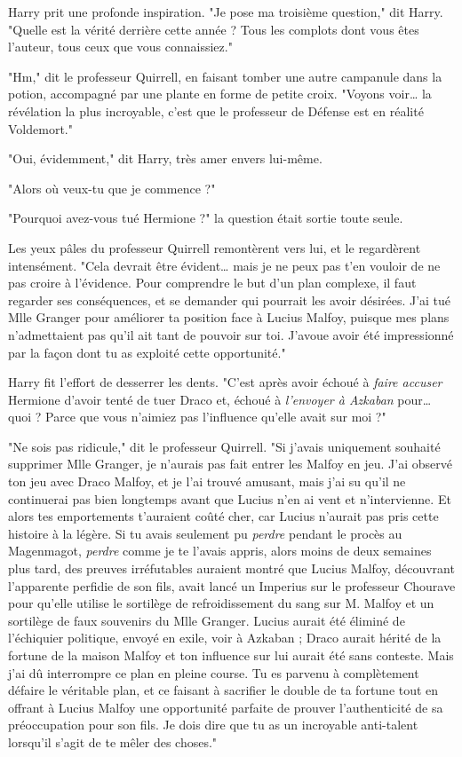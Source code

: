 Harry prit une profonde inspiration. "Je pose ma troisième question," dit Harry. "Quelle est la vérité derrière cette année ? Tous les complots dont vous êtes l'auteur, tous ceux que vous connaissiez."

"Hm," dit le professeur Quirrell, en faisant tomber une autre campanule dans la potion, accompagné par une plante en forme de petite croix. "Voyons voir… la révélation la plus incroyable, c'est que le professeur de Défense est en réalité Voldemort."

"Oui, évidemment," dit Harry, très amer envers lui-même.

"Alors où veux-tu que je commence ?"

"Pourquoi avez-vous tué Hermione ?" la question était sortie toute seule.

Les yeux pâles du professeur Quirrell remontèrent vers lui, et le regardèrent intensément. "Cela devrait être évident… mais je ne peux pas t'en vouloir de ne pas croire à l'évidence. Pour comprendre le but d'un plan complexe, il faut regarder ses conséquences, et se demander qui pourrait les avoir désirées. J'ai tué Mlle Granger pour améliorer ta position face à Lucius Malfoy, puisque mes plans n'admettaient pas qu'il ait tant de pouvoir sur toi. J'avoue avoir été impressionné par la façon dont tu as exploité cette opportunité."

Harry fit l'effort de desserrer les dents. "C'est après avoir échoué à \emph{faire accuser}  Hermione d'avoir tenté de tuer Draco et, échoué à \emph{l'envoyer à Azkaban}  pour… quoi ? Parce que vous n'aimiez pas l'influence qu'elle avait sur moi ?"

"Ne sois pas ridicule," dit le professeur Quirrell. "Si j'avais uniquement souhaité supprimer Mlle Granger, je n'aurais pas fait entrer les Malfoy en jeu. J'ai observé ton jeu avec Draco Malfoy, et je l'ai trouvé amusant, mais j'ai su qu'il ne continuerai pas bien longtemps avant que Lucius n'en ai vent et n'intervienne. Et alors tes emportements t'auraient coûté cher, car Lucius n'aurait pas pris cette histoire à la légère. Si tu avais seulement pu \emph{perdre}  pendant le procès au Magenmagot, \emph{perdre}  comme je te l'avais appris, alors moins de deux semaines plus tard, des preuves irréfutables auraient montré que Lucius Malfoy, découvrant l'apparente perfidie de son fils, avait lancé un Imperius sur le professeur Chourave pour qu'elle utilise le sortilège de refroidissement du sang sur M. Malfoy et un sortilège de faux souvenirs du Mlle Granger. Lucius aurait été éliminé de l'échiquier politique, envoyé en exile, voir à Azkaban ; Draco aurait hérité de la fortune de la maison Malfoy et ton influence sur lui aurait été sans conteste. Mais j'ai dû interrompre ce plan en pleine course. Tu es parvenu à complètement défaire le véritable plan, et ce faisant à sacrifier le double de ta fortune tout en offrant à Lucius Malfoy une opportunité parfaite de prouver l'authenticité de sa préoccupation pour son fils. Je dois dire que tu as un incroyable anti-talent lorsqu'il s'agit de te mêler des choses."

